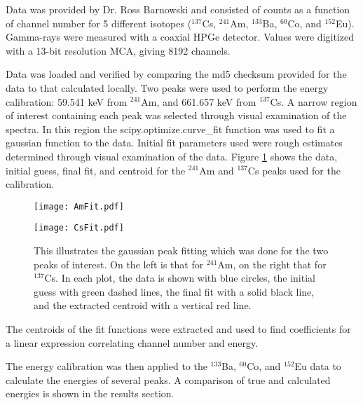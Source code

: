 Data was provided by Dr. Ross Barnowski and consisted of counts as a function of channel number for 5 different isotopes (${}^{137}$Cs, ${}^{241}$Am, ${}^{133}$Ba, ${}^{60}$Co, and ${}^{152}$Eu). Gamma-rays were measured with a coaxial HPGe detector. Values were digitized with a 13-bit resolution MCA, giving 8192 channels.

Data was loaded and verified by comparing the md5 checksum provided for the data to that calculated locally.
Two peaks were used to perform the energy calibration: 59.541 keV from ${}^{241}$Am, and 661.657 keV from ${}^{137}$Cs. A narrow region of interest containing each peak was selected through visual examination of the spectra. In this region the scipy.optimize.curve\_fit function was used to fit a gaussian function to the data. Initial fit parameters used were rough estimates determined through visual examination of the data. Figure \ref{AmCsFit} shows the data, initial guess, final fit, and centroid for the ${}^{241}$Am and ${}^{137}$Cs peaks used for the calibration.

\begin{figure}
\centering
\begin{minipage}{.5\textwidth}
  \centering
  \texttt{[image: AmFit.pdf]}
\end{minipage}%
\begin{minipage}{.5\textwidth}
  \centering
  \texttt{[image: CsFit.pdf]}
\end{minipage}
\caption{This illustrates the gaussian peak fitting which was done for the two peaks of interest. On the left is that for ${}^{241}$Am, on the right that for ${}^{137}$Cs. In each plot, the data is shown with blue circles, the initial guess with green dashed lines, the final fit with a solid black line, and the extracted centroid with a vertical red line.}
\label{AmCsFit}
\end{figure}

The centroids of the fit functions were extracted and used to find coefficients for a linear expression correlating channel number and energy.

The energy calibration was then applied to the ${}^{133}$Ba, ${}^{60}$Co, and ${}^{152}$Eu data to calculate the energies of several peaks. A comparison of true and calculated energies is shown in the results section.
